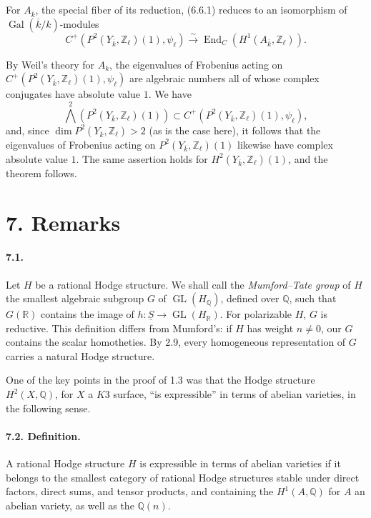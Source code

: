 \documentclass[10pt,leqno]{article}
\newcommand{\Q}{\mathbb{Q}}
\newcommand{\R}{\mathbb{R}}
\newcommand{\Z}{\mathbb{Z}}
\newcommand{\Gal}{\operatorname{Gal}}
\newcommand{\End}{\operatorname{End}}
\newcommand{\GL}{\operatorname{GL}}
\newcommand{\iso}{\xrightarrow{\sim}}
\begin{document}
For $A_{\overline k}$, the special fiber of its reduction, (6.6.1) reduces to an isomorphism of $\Gal(\overline k/k)$-modules
\[
\tag{6.6.2}
C^+(P^2(Y_{\overline k},\Z_\ell)(1),\psi_\ell)\iso
\End_C(H^1(A_{\overline k},\Z_\ell)).
\]

\clearpage

By Weil's theory for $A_k$, the eigenvalues of Frobenius acting on $C^+(P^2(Y_{\overline k},\Z_\ell)(1),\psi_\ell)$ are algebraic numbers all of whose complex conjugates have absolute value $1$. We have
\[
\mathop{\bigwedge}\limits^2(P^2(Y_{\overline k},\Z_\ell)(1))
\subset C^+(P^2(Y_{\overline k},\Z_\ell)(1),\psi_\ell),
\]
and, since $\dim P^2(Y_{\overline k},\Z_\ell)>2$ (as is the case here), it follows that the eigenvalues of Frobenius acting on $P^2(Y_{\overline k},\Z_\ell)(1)$ likewise have complex absolute value $1$. The same assertion holds for $H^2(Y_{\overline k},\Z_\ell)(1)$, and the theorem follows.

\section*{7. Remarks}

\paragraph{7.1.} Let $H$ be a rational Hodge structure. We shall call the \emph{Mumford--Tate group} of $H$ the smallest algebraic subgroup $G$ of $\GL(H_\Q)$, defined over $\Q$, such that $G(\R)$ contains the image of $h:\underline S\to\GL(H_\R)$. For polarizable $H$, $G$ is reductive. This definition differs from Mumford's: if $H$ has weight $n\ne0$, our $G$ contains the scalar homotheties. By 2.9, every homogeneous representation of $G$ carries a natural Hodge structure.

One of the key points in the proof of 1.3 was that the Hodge structure $H^2(X,\Q)$, for $X$ a $K3$ surface, ``is expressible'' in terms of abelian varieties, in the following sense.

\paragraph{7.2. Definition.} A rational Hodge structure $H$ is expressible in terms of abelian varieties if it belongs to the smallest category of rational Hodge structures stable under direct factors, direct sums, and tensor products, and containing the $H^1(A,\Q)$ for $A$ an abelian variety, as well as the $\Q(n)$.
\end{document}
